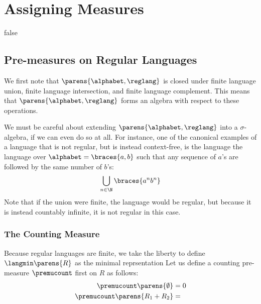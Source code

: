 \section{Assigning Measures}




\if false

\subsection{Pre-measures on Regular Languages}
We first note that \(\parens{\alphabet, \reglang}\) is closed under
finite language union, finite language intersection,
and finite language complement.
This means that \(\parens{\alphabet, \reglang}\) forms an algebra
with respect to these operations.

We must be careful about extending \(\parens{\alphabet, \reglang}\) into a
\(\sigma\)-algebra, if we can even do so at all.
For instance, one of the canonical examples of a language that is not
regular, but is instead context-free, is the language the language
over \(\alphabet = \braces{a, b}\) such that
any sequence of \(a\)'s are followed by the same number of \(b\)'s:
\[
  \bigcup_{n \in \N} \braces{a^n b^n}
\]
Note that if the union were finite, the language would be regular,
but because it is instead countably infinite, it is not regular in this case.

\subsubsection{The Counting Measure}
Because regular languages are finite, we take the liberty to define
\(\langmin\parens{R}\) as the minimal reprsentation
Let us define a counting pre-measure \(\premucount\) first on \(R\)
as follows:
\begin{align*}
  \premucount\parens{\emptyset} &= 0 \\
  \premucount\parens{R_1 + R_2} &= 
\end{align*}


\fi

